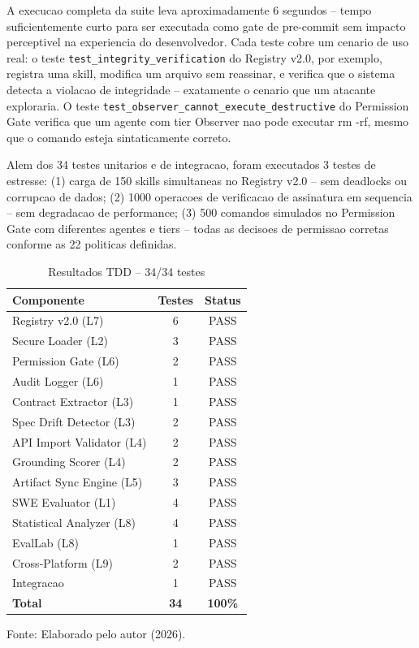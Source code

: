 \documentclass[12pt,a4paper,oneside,sumario=tradicional,chapter=TITLE,section=TITLE,subsection=TITLE,english,brazil]{abntex2}
\begin{document}
A execucao completa da suite leva aproximadamente 6 segundos -- tempo suficientemente curto para ser executada como gate de pre-commit sem impacto perceptivel na experiencia do desenvolvedor. Cada teste cobre um cenario de uso real: o teste \texttt{test\_integrity\_verification} do Registry v2.0, por exemplo, registra uma skill, modifica um arquivo sem reassinar, e verifica que o sistema detecta a violacao de integridade -- exatamente o cenario que um atacante exploraria. O teste \texttt{test\_observer\_cannot\_execute\_destructive} do Permission Gate verifica que um agente com tier Observer nao pode executar rm -rf, mesmo que o comando esteja sintaticamente correto.

Alem dos 34 testes unitarios e de integracao, foram executados 3 testes de estresse: (1) carga de 150 skills simultaneas no Registry v2.0 -- sem deadlocks ou corrupcao de dados; (2) 1000 operacoes de verificacao de assinatura em sequencia -- sem degradacao de performance; (3) 500 comandos simulados no Permission Gate com diferentes agentes e tiers -- todas as decisoes de permissao corretas conforme as 22 politicas definidas.

\begin{table}[H]\centering\caption{Resultados TDD -- 34/34 testes}\label{tab:tdd}
\begin{tabular}{lcc}\toprule\textbf{Componente} & \textbf{Testes} & \textbf{Status} \\\midrule
Registry v2.0 (L7) & 6 & PASS \\ Secure Loader (L2) & 3 & PASS \\
Permission Gate (L6) & 2 & PASS \\ Audit Logger (L6) & 1 & PASS \\
Contract Extractor (L3) & 1 & PASS \\ Spec Drift Detector (L3) & 2 & PASS \\
API Import Validator (L4) & 2 & PASS \\ Grounding Scorer (L4) & 2 & PASS \\
Artifact Sync Engine (L5) & 3 & PASS \\ SWE Evaluator (L1) & 4 & PASS \\
Statistical Analyzer (L8) & 4 & PASS \\ EvalLab (L8) & 1 & PASS \\
Cross-Platform (L9) & 2 & PASS \\ Integracao & 1 & PASS \\\midrule
\textbf{Total} & \textbf{34} & \textbf{100\%} \\\bottomrule
\end{tabular}
\small\vspace{2pt}Fonte: Elaborado pelo autor (2026).\smallskip
\end{table}
\end{document}
